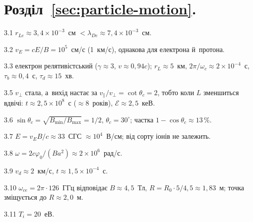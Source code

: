 \protect \section *{Розділ~\ref *{sec:particle-motion}. }
\begin{Solution}{3.{1}}
		$r_{Le}\approx3{,}4\times10^{-3}$~см $<\lambda_{De}\approx7{,}4\times10^{-3}$~см.
	
\end{Solution}
\begin{Solution}{3.{2}}
		$v_E=cE/B=10^{5}$~см/с (1~км/с), однакова для електрона й~протона.
	
\end{Solution}
\begin{Solution}{3.{3}}
		електрон релятивістський ($\gamma\approx3$, $v\approx0{,}94c$); $r_L\approx5$~км,
	$2\pi/\omega_c\approx2\times10^{-4}$~с, $\tau_b\approx0{,}4$~с, $\tau_d\approx15$~хв.
	
\end{Solution}
\begin{Solution}{3.{5}}
		$v_\perp$ стала, а~вихід настає за $v_\parallel/v_\perp=\cot\theta_c=2$, тобто коли $L$ зменшиться вдвічі:
	$t\approx2{,}5\times10^8$~с ($\approx8$~років), $\mathcal E\approx2{,}5$~кеВ.
	
\end{Solution}
\begin{Solution}{3.{6}}
		$\sin\theta_c=\sqrt{B_{\min}/B_{\max}}=1/2$, $\theta_c=30^\circ$; частка $1-\cos\theta_c\approx13\,\%$.
	
\end{Solution}
\begin{Solution}{3.{7}}
		$E=v_EB/c\approx33$~СГС $\approx10^4$~В/см; від сорту іонів не залежить.
	
\end{Solution}
\begin{Solution}{3.{8}}
		$\omega=2c\varphi_0/(Ba^2)\approx2\times10^6$~рад/с.
	
\end{Solution}
\begin{Solution}{3.{9}}
		$v_d\approx2$~км/с, $t\approx1{,}5\times10^{-4}$~с.
	
\end{Solution}
\begin{Solution}{3.{10}}
		$\omega_{ce}=2\pi\cdot126$~ГГц відповідає $B\approx4{,}5$~Тл, $R=R_0\cdot5/4{,}5\approx1{,}83$~м; точка зміщується до $R\approx2{,}0$~м.
	
\end{Solution}
\begin{Solution}{3.{11}}
		$T_i=20$~еВ.
	
\end{Solution}
